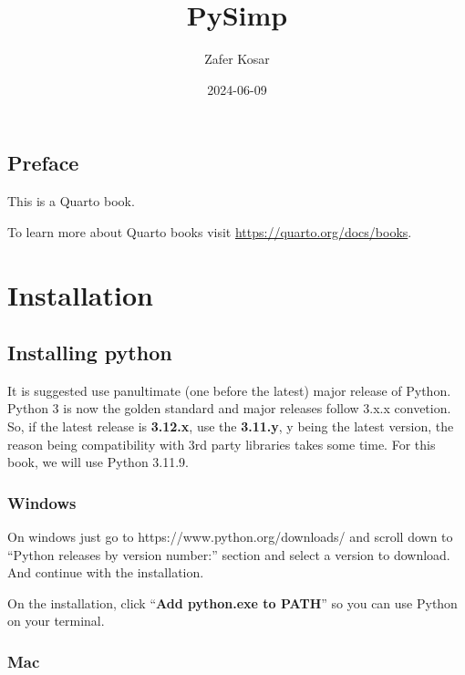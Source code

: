 \documentclass[
  letterpaper,
  DIV=11,
  numbers=noendperiod]{scrreprt}
\title{PySimp}
\author{Zafer Kosar}
\date{2024-06-09}
\renewcommand*\contentsname{Table of contents}
\newcommand\contentsname{Table of contents}
\begin{document}
\maketitle

\renewcommand*\contentsname{Table of contents}
{
\hypersetup{linkcolor=}
\setcounter{tocdepth}{2}
\tableofcontents
}


\chapter*{Preface}\label{preface}


This is a Quarto book.

To learn more about Quarto books visit
\url{https://quarto.org/docs/books}.

\part{Installation}

\chapter{Installing python}\label{installing-python}

It is suggested use panultimate (one before the latest) major release of
Python. Python 3 is now the golden standard and major releases follow
3.x.x convetion. So, if the latest release is \textbf{3.12.x}, use the
\textbf{3.11.y}, y being the latest version, the reason being
compatibility with 3rd party libraries takes some time. For this book,
we will use Python 3.11.9.

\section{Windows}\label{windows}

On windows just go to https://www.python.org/downloads/ and scroll down
to ``Python releases by version number:'' section and select a version
to download. And continue with the installation.

On the installation, click ``\textbf{Add python.exe to PATH}'' so you
can use Python on your terminal.

\section{Mac}\label{mac}
\end{document}
